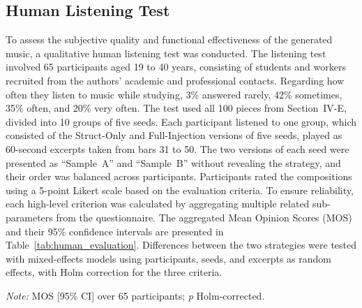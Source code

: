 \documentclass[conference,a4paper]{IEEEtran}
\begin{document}
\subsection{Human Listening Test}
To assess the subjective quality and functional effectiveness of the generated music, a qualitative human listening test was conducted. The listening test involved 65 participants aged 19 to 40 years, consisting of students and workers recruited from the authors' academic and professional contacts. Regarding how often they listen to music while studying, 3\% answered rarely, 42\% sometimes, 35\% often, and 20\% very often. The test used all 100 pieces from Section~IV-E, divided into 10 groups of five seeds. Each participant listened to one group, which consisted of the Struct-Only and Full-Injection versions of five seeds, played as 60-second excerpts taken from bars 31 to 50. The two versions of each seed were presented as ``Sample~A'' and ``Sample~B'' without revealing the strategy, and their order was balanced across participants. Participants rated the compositions using a 5-point Likert scale based on the evaluation criteria. To ensure reliability, each high-level criterion was calculated by aggregating multiple related sub-parameters from the questionnaire. The aggregated Mean Opinion Scores (MOS) and their 95\% confidence intervals are presented in Table~\ref{tab:human_evaluation}. Differences between the two strategies were tested with mixed-effects models using participants, seeds, and excerpts as random effects, with Holm correction for the three criteria.

\begin{table}[htbp]
\caption{Human Listening Test Results (Mean Opinion Score)}
\label{tab:human_evaluation}
\centering
{}
\vspace{2pt}
\parbox{\columnwidth}{\small \textit{Note:} MOS [95\% CI] over 65 participants; \textit{p} Holm-corrected.}
\end{table}
\end{document}
